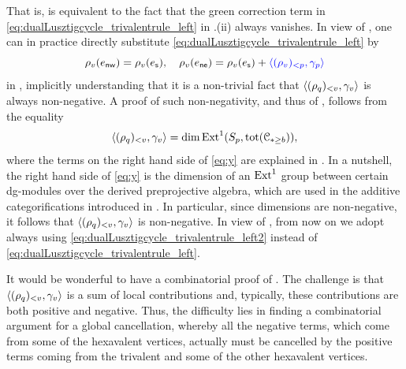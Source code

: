 \noindent That is,  is equivalent to the fact that the green correction term in \eqref{eq:dualLusztigcycle_trivalentrule_left} in .(ii) always vanishes. In view of , one can in practice directly substitute \eqref{eq:dualLusztigcycle_trivalentrule_left} by
  \begin{equation}\label{eq:dualLusztigcycle_trivalentrule_left2}
    \rho_v(e_\mathsf{nw})=\rho_v(e_\mathsf{s}),\quad \rho_v(e_\mathsf{ne})=\rho_v(e_\mathsf{s})+\textcolor{blue}{\langle (\rho_v)_{<p},\gamma_p\rangle}
    \end{equation}
in , implicitly understanding that it is a non-trivial fact that $\langle (\rho_q)_{<v},\gamma_v\rangle$ is always non-negative. A proof of such non-negativity, and thus of , follows from the equality
\begin{equation}\label{eq:y}
\langle (\rho_q)_{<v},\gamma_v\rangle = \operatorname{dim}\operatorname{Ext}^1(S_{p},\operatorname{tot}(\mathcal{C}_{\ast\geq b})),
\end{equation}
where the terms on the right hand side of \eqref{eq:y} are explained in \cite[Section 9]{CasalsChrist}. In a nutshell, the right hand side of \eqref{eq:y} is the dimension of an $\operatorname{Ext}^1$ group between certain dg-modules over the derived preprojective algebra, which are used in the additive categorifications introduced in \cite[Theorems A\&B]{CasalsChrist}. In particular, since dimensions are non-negative, it follows that $\langle (\rho_q)_{<v},\gamma_v\rangle$ is non-negative. In view of , from now on we adopt  always using \eqref{eq:dualLusztigcycle_trivalentrule_left2} instead of \eqref{eq:dualLusztigcycle_trivalentrule_left}.

\begin{remark}\label{rmk:rightveering_combinatorial} It would be wonderful to have a combinatorial proof of . The challenge is that $\langle (\rho_q)_{<v},\gamma_v\rangle$ is a sum of local contributions and, typically, these contributions are both positive and negative. Thus, the difficulty lies in finding a combinatorial argument for a global cancellation, whereby all the negative terms, which come from some of the hexavalent vertices, actually must be cancelled by the positive terms coming from the trivalent and some of the other hexavalent vertices.\sbs
\end{remark}



